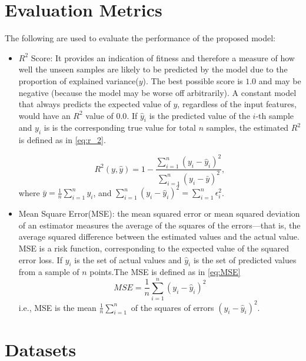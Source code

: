 \section{Evaluation Metrics}
The following are used to evaluate the performance of the proposed model:
\begin{itemize} 
\item \(R^2\) Score: It provides an indication of fitness and therefore a measure of how well the unseen samples are likely to be predicted by the model due to the proportion of explained variance($y$). The best possible score is $1.0$ and may be negative (because the model may be worse off arbitrarily). A constant model that always predicts the expected value of $y$, regardless of the input features, would have an \(R^2\) value of $0.0$. If $\hat{y}_i$ is the predicted value of the \(i\)-th sample and $y_i$ is  is the corresponding true value for total \(n\) samples, the estimated \(R^2\) is defined as in \ref{eq:r_2}.

\begin{equation}
    R^2(y, \hat{y}) = 1 - \frac{\sum_{i=1}^{n} (y_i - \hat{y}_i)^2}{\sum_{i=1}^{n} (y_i - \bar{y})^2},
    \label{eq:r_2}
\end{equation}
where $\bar{y} = \frac{1}{n} \sum_{i=1}^{n} y_i$, and $\sum_{i=1}^{n} (y_i - \hat{y}_i)^2 = \sum_{i=1}^{n} \epsilon_i^2$.\\

\item Mean Square Error(MSE): the mean squared error or mean squared deviation of an estimator measures the average of the squares of the errors—that is, the average squared difference between the estimated values and the actual value. MSE is a risk function, corresponding to the expected value of the squared error loss. If $y_i$ is the set of actual values and $\hat{y}_i$ is the set of predicted values from a sample of $n$ points.The MSE is defined as in \ref{eq:MSE}
\begin{equation}
    MSE =  \frac{1}{n} \sum_{i=1}^{n} (y_i - \hat{y}_i)^2
    \label{eq:MSE}
\end{equation}
i.e., MSE is the mean $\frac{1}{n} \sum_{i=1}^{n}$ of the squares of errors $(y_i - \hat{y}_i)^2$.  

\end{itemize}
\section{Datasets}


